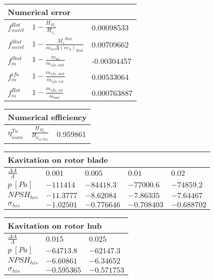 \vspace{20pt}\newline
\begin{tabular}{|l|l|l|}
\multicolumn{3}{l}{Numerical error} \\ 
\hline
$f_{swirl}^{Rot}$ &$1-\frac{H_{M_z}}{H_{c_u}}$ & 0.00098533 \\ 
\hline
$f_{swirl}^{Stat}$ &$1-\frac{{M_z}^{Stat}}{\dot m_{in}\Delta(rc_u)_{Stat}}$ & 0.00709662 \\ 
\hline
$f_{\dot m}^{Stat}$ &$1-\frac{\dot m_{in}}{\dot m_{ifa,stat}}$ & -0.00304457 \\ 
\hline
$f_{\dot m}^{ifa}$ &$1-\frac{\dot m_{ifa,stat}}{\dot m_{ifa,rot}}$ & 0.00533064 \\ 
\hline
$f_{\dot m}^{Rot}$ &$1-\frac{\dot m_{ifa,rot}}{\dot m_{out}}$ & 0.000763887 \\ 
\hline
\end{tabular}
\vspace{20pt}\newline
\begin{tabular}{|l|l|l|}
\multicolumn{3}{l}{Numerical efficiency} \\ 
\hline
$\eta^{Tu}_{num}$ &$\frac{H_{M_z}}{H_{p_{tot,Rot}}}$ & 0.959861 \\ 
\hline
\end{tabular}
\vspace{20pt}\newline
\begin{tabular}{|l|l|l|l|l|}
\multicolumn{5}{l}{Kavitation on rotor blade} \\ 
\hline
$\frac{\Delta A}{A}$ & $0.001$& $0.005$& $0.01$& $0.02$  \\ 
\hline
$p \ [Pa]$ & $-111414$& $-84418.3$& $-77000.6$& $-74859.2$  \\ 
\hline
$NPSH_{his}$ & $-11.3777$& $-8.62084$& $-7.86335$& $-7.64467$  \\ 
\hline
$\sigma_{his}$ & $-1.02501$& $-0.776646$& $-0.708403$& $-0.688702$  \\ 
\hline
\end{tabular}
\vspace{20pt}\newline
\begin{tabular}{|l|l|l|}
\multicolumn{3}{l}{Kavitation on rotor hub} \\ 
\hline
$\frac{\Delta A}{A}$ & $0.015$& $0.025$  \\ 
\hline
$p \ [Pa]$ & $-64713.8$& $-62147.3$  \\ 
\hline
$NPSH_{his}$ & $-6.60861$& $-6.34652$  \\ 
\hline
$\sigma_{his}$ & $-0.595365$& $-0.571753$  \\ 
\hline
\end{tabular}
